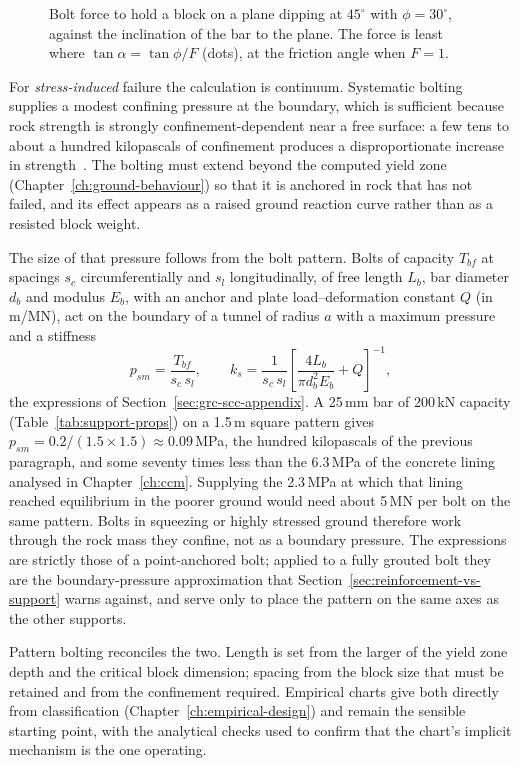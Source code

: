 \begin{figure}[htbp]
\centering
{}
\caption{Bolt force to hold a block on a plane dipping at $45^\circ$ with $\phi = 30^\circ$, against the inclination of the bar to the plane. The force is least where $\tan\alpha = \tan\phi/F$ (dots), at the friction angle when $F = 1$.}
\label{fig:bolt-inclination}
\end{figure}

For \emph{stress-induced} failure the calculation is continuum. Systematic
bolting supplies a modest confining pressure at the boundary, which is
sufficient because rock strength is strongly confinement-dependent near a
free surface: a few tens to about a hundred kilopascals of confinement produces a
disproportionate increase in strength~\citep{hoek1995support}. The bolting must extend beyond the computed yield zone
(Chapter~\ref{ch:ground-behaviour}) so that it is anchored in rock that has
not failed, and its effect appears as a raised ground reaction curve rather
than as a resisted block weight.

The size of that pressure follows from the bolt pattern. Bolts of capacity
$T_{bf}$ at spacings $s_c$ circumferentially and $s_l$ longitudinally, of
free length $L_b$, bar diameter $d_b$ and modulus $E_b$, with an anchor and plate
load--deformation constant $Q$ (in m/MN), act on the boundary of a tunnel of
radius $a$ with a maximum pressure and a stiffness~\citep{hoekbrown1980underground,carranza2000ccm}
\[
p_{sm} = \frac{T_{bf}}{s_c\, s_l}, \qquad
k_s = \frac{1}{s_c\, s_l}\left[\frac{4L_b}{\pi d_b^2 E_b} + Q\right]^{-1},
\]
the expressions of Section~\ref{sec:grc-scc-appendix}. A 25\,mm bar of
200\,kN capacity (Table~\ref{tab:support-props}) on a 1.5\,m square pattern
gives $p_{sm} = 0.2/(1.5 \times 1.5) \approx 0.09$\,MPa, the hundred
kilopascals of the previous paragraph, and some seventy times less than the
6.3\,MPa of the concrete lining analysed in Chapter~\ref{ch:ccm}. Supplying
the 2.3\,MPa at which that lining reached equilibrium in the poorer ground
would need about 5\,MN per bolt on the same pattern. Bolts in squeezing or
highly stressed ground therefore work through the rock mass they confine, not
as a boundary pressure. The expressions are strictly those of a point-anchored
bolt; applied to a fully grouted bolt they are the boundary-pressure
approximation that Section~\ref{sec:reinforcement-vs-support} warns against,
and serve only to place the pattern on the same axes as the other supports.

Pattern bolting reconciles the two. Length is set from the larger
of the yield zone depth and the critical block dimension; spacing from the
block size that must be retained and from the confinement required. Empirical
charts give both directly from classification (Chapter~\ref{ch:empirical-design}) and
remain the sensible starting point, with the analytical checks used to confirm
that the chart's implicit mechanism is the one operating.

